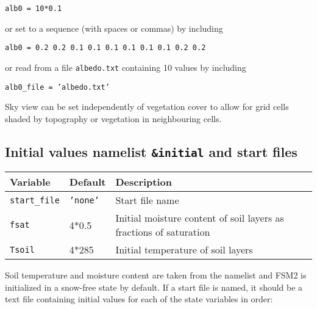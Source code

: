 \documentclass{article}
\begin{document}
{\tt alb0 = 10*0.1}

or set to a sequence (with spaces or commas) by including

{\tt alb0 = 0.2 0.2 0.1 0.1 0.1 0.1 0.1 0.1 0.2 0.2} 

or read from a file {\tt albedo.txt} containing 10 values by including

{\tt alb0\_file = 'albedo.txt'}

Sky view can be set independently of vegetation cover to allow for grid cells shaded by topography or vegetation in neighbouring cells.

\subsection*{Initial values namelist {\tt \&initial} and start files}

\begin{tabular}{|l|l|l|}
\hline
Variable          & Default & Description                                                        \\
\hline
{\tt start\_file} & {\tt 'none'}  & Start file name                                                    \\
{\tt fsat}        & 4*0.5         & Initial moisture content of soil layers as fractions of saturation \\
{\tt Tsoil}       & 4*285         & Initial temperature of soil layers                                 \\

\hline 
\end{tabular}

Soil temperature and moisture content are taken from the namelist and FSM2 is initialized in a snow-free state by default. If a start file is named, it should be a text file containing initial values for each of the state variables in order:
\end{document}
